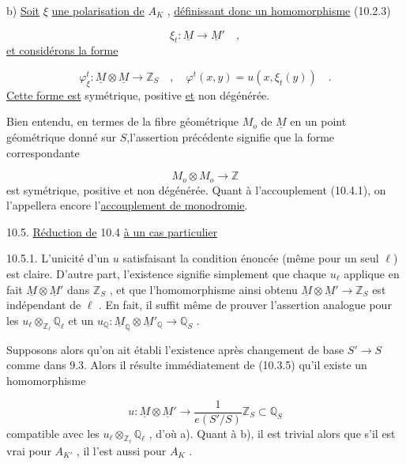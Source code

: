 b) \underline{Soit} $\xi$ \underline{une polarisation de} $A_K$ , \underline{définissant donc un homomorphisme} (10.2.3)

\begin{equation*}
\xi_t : \underline{M} \longrightarrow \underline{M}' \quad ,
\end{equation*}
\underline{et considérons la forme}

\begin{equation}\tag{10.4.2}
\varphi_\xi^t : \underline{M} \otimes \underline{M} \longrightarrow \mathbb{Z}_S \quad , \quad \varphi^t(x,y) = u(x,\xi_t(y)) \quad .
\end{equation}
\underline{Cette forme est} symétrique, positive \underline{et} non dégénérée.

Bien entendu, en termes de la fibre géométrique $M_o$ de $\underline{M}$ en un point géométrique donné sur $S$,l'assertion précédente signifie que la forme correspondante

\begin{equation*}
M_o \otimes M_o \longrightarrow \mathbb{Z}
\end{equation*}
est symétrique, positive et non dégénérée. Quant à l'accouplement (10.4.1), on l'appellera encore l'\underline{accouplement de monodromie}.




10.5. \underline{Réduction de} 10.4 \underline{à un cas particulier}

10.5.1. L'unicité d'un $u$ satisfaisant la condition énoncée (même pour un seul $\ell$) est claire. D'autre part, l'existence signifie simplement que chaque $u_\ell$ applique en fait $\underline{M} \otimes \underline{M}'$ dans $\mathbb{Z}_S$ , et que l'homomorphisme ainsi obtenu $\underline{M} \otimes \underline{M}' \longrightarrow \mathbb{Z}_S$ est indépendant de $\ell$ . En fait, il suffit même de prouver l'assertion analogue pour les $u_\ell \otimes_{\mathbb{Z}_\ell} \mathbb{Q}_\ell$ et un $u_{\mathbb{Q}} : \underline{M}_{\mathbb{Q}} \otimes \underline{M}'_{\mathbb{Q}} \longrightarrow \mathbb{Q}_S$ .

Supposons alors qu'on ait établi l'existence après changement de base $S' \longrightarrow S$ comme dans 9.3. Alors il résulte immédiatement de (10.3.5) qu'il existe un homomorphisme

\begin{equation*}
u : \underline{M} \otimes \underline{M}' \longrightarrow \frac{1}{e(S'/S)} \mathbb{Z}_S \subset \mathbb{Q}_S
\end{equation*}
compatible avec les $u_\ell \otimes_{\mathbb{Z}_\ell} \mathbb{Q}_\ell$ , d'où a). Quant à b), il est trivial alors que s'il est vrai pour $A_{K'}$ , il l'est aussi pour $A_K$ .

